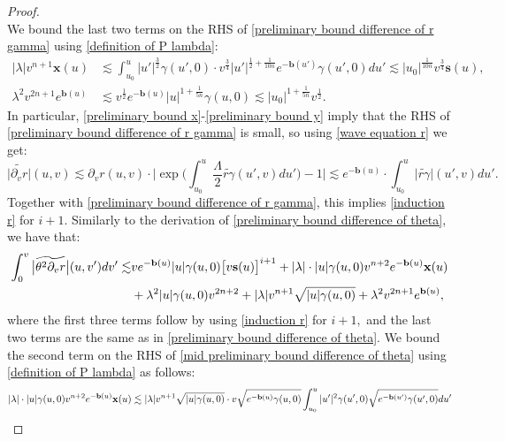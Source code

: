 \documentclass[11pt]{article}
\numberwithin{equation}{section}
\begin{document}
\begin{proof}
\begin{equation}
    \end{equation}
    We bound the last two terms on the RHS of \eqref{preliminary bound difference of r gamma} using \eqref{definition of P lambda}:
    \begin{align}
        |\lambda| v^{n+1}\mathbf{x}(u)&\lesssim\int_{u_0}^u|u'|^{\frac{3}{2}}\gamma(u',0)\cdot v^{\frac{3}{4}}|u'|^{\frac{1}{2}+\frac{1}{10n}}e^{-\mathbf{b}(u')}\gamma(u',0)du'\lesssim |u_0|^{\frac{1}{10n}}v^{\frac{3}{4}}\mathbf{s}(u),\label{preliminary bound x}\\
        \lambda^2v^{2n+1}e^{\mathbf{b}(u)}&\lesssim v^{\frac{1}{2}}e^{-\mathbf{b}(u)}|u|^{1+\frac{1}{5n}}\gamma(u,0)\lesssim|u_0|^{1+\frac{1}{5n}}v^{\frac{1}{2}}.\label{preliminary bound y}
    \end{align}
    In particular, \eqref{preliminary bound x}-\eqref{preliminary bound y} imply that the RHS of \eqref{preliminary bound difference of r gamma} is small, so using \eqref{wave equation r} we get:
    \begin{equation}\label{preliminary bound difference of dv r}
        \big|\widetilde{\partial_vr}\big|(u,v)\lesssim\partial_vr(u,v)\cdot\bigg|\exp\bigg(\int_{u_0}^u\frac{\Lambda}{2}\widetilde{r\gamma}(u',v)du'\bigg)-1\bigg|\lesssim e^{-\mathbf{b}(u)}\cdot\int_{u_0}^u\big|\widetilde{r\gamma}\big|(u',v)du'.
    \end{equation}
    Together with \eqref{preliminary bound difference of r gamma}, this implies \eqref{induction r} for $i+1.$ Similarly to the derivation of \eqref{preliminary bound difference of theta}, we have that:
    \begin{align}
        \int_0^v\big|\widetilde{\theta^2\partial_vr}\big|(u,v')dv'\lesssim&ve^{-\mathbf{b}(u)}|u|\gamma(u,0)\big[v\mathbf{s}(u)\big]^{i+1}+|\lambda|\cdot|u|\gamma(u,0)v^{n+2}e^{-\mathbf{b}(u)}\mathbf{x}(u)\label{mid preliminary bound difference of theta}\\
        &+\lambda^2|u|\gamma(u,0)v^{2n+2}+|\lambda| v^{n+1}\sqrt{|u|\gamma(u,0)}+\lambda^2v^{2n+1}e^{\mathbf{b}(u)},\notag
    \end{align}
    where the first three terms follow by using \eqref{induction r} for $i+1,$ and the last two terms are the same as in \eqref{preliminary bound difference of theta}. We bound the second term on the RHS of \eqref{mid preliminary bound difference of theta} using \eqref{definition of P lambda} as follows:
    \begin{align}\label{some bound I need later}
        |\lambda|\cdot|u|\gamma(u,0)v^{n+2}e^{-\mathbf{b}(u)}\mathbf{x}(u)&\lesssim|\lambda| v^{n+1}\sqrt{|u|\gamma(u,0)}\cdot v\sqrt{e^{-\mathbf{b}(u)}\gamma(u,0)}\int_{u_0}^u|u'|^2\gamma(u',0)\sqrt{e^{-\mathbf{b}(u')}\gamma(u',0)}du'\notag\\

\end{align}
\end{proof}
\end{document}
